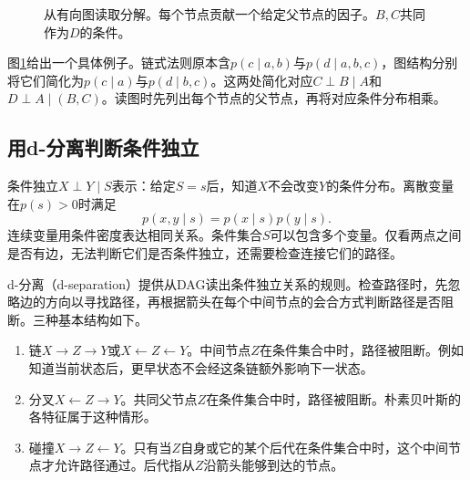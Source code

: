 \begin{figure}[htbp]
\centering
{}
\caption{从有向图读取分解。每个节点贡献一个给定父节点的因子。$B,C$共同作为$D$的条件。}
\label{fig:bayes-dag-factorization}
\end{figure}

图\ref{fig:bayes-dag-factorization}给出一个具体例子。链式法则原本含$p(c\mid a,b)$与$p(d\mid a,b,c)$，图结构分别将它们简化为$p(c\mid a)$与$p(d\mid b,c)$。这两处简化对应$C\perp B\mid A$和$D\perp A\mid(B,C)$。读图时先列出每个节点的父节点，再将对应条件分布相乘。

\subsection{用d-分离判断条件独立}
条件独立$X\perp Y\mid S$表示：给定$S=s$后，知道$X$不会改变$Y$的条件分布。离散变量在$p(s)>0$时满足
\begin{equation}
 p(x,y\mid s)=p(x\mid s)p(y\mid s).
\end{equation}
连续变量用条件密度表达相同关系。条件集合$S$可以包含多个变量。仅看两点之间是否有边，无法判断它们是否条件独立，还需要检查连接它们的路径。

d-分离（d-separation）提供从DAG读出条件独立关系的规则。检查路径时，先忽略边的方向以寻找路径，再根据箭头在每个中间节点的会合方式判断路径是否阻断。三种基本结构如下。
\begin{enumerate}
 \item 链$X\to Z\to Y$或$X\leftarrow Z\leftarrow Y$。中间节点$Z$在条件集合中时，路径被阻断。例如知道当前状态后，更早状态不会经这条链额外影响下一状态。
 \item 分叉$X\leftarrow Z\to Y$。共同父节点$Z$在条件集合中时，路径被阻断。朴素贝叶斯的各特征属于这种情形。
 \item 碰撞$X\to Z\leftarrow Y$。只有当$Z$自身或它的某个后代在条件集合中时，这个中间节点才允许路径通过。后代指从$Z$沿箭头能够到达的节点。
\end{enumerate}

